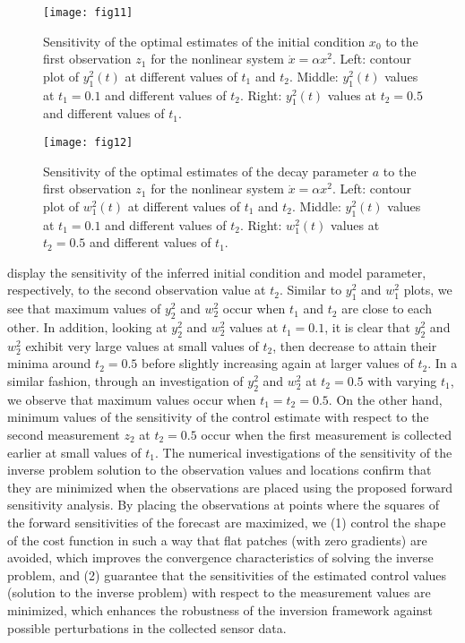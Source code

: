 \documentclass{article}
\begin{document}
\begin{figure}[ht!]
    \centering
    \texttt{[image: fig11]}
    \caption{Sensitivity of the optimal estimates of the initial condition $x_0$ to the first observation $z_1$ for the nonlinear system $\dot{x} = \alpha x^2$. Left: contour plot of $y_1^2(t)$ at different values of $t_1$ and $t_2$. Middle: $y_1^2(t)$ values at $t_1=0.1$ and different values of $t_2$. Right: $y_1^2(t)$ values at $t_2=0.5$ and different values of $t_1$.}
    \label{fig:y1non}
\end{figure}

\begin{figure}[ht!]
    \centering
    \texttt{[image: fig12]}
    \caption{Sensitivity of the optimal estimates of the decay parameter $a$ to the first observation $z_1$ for the nonlinear system $\dot{x} = \alpha x^2$. Left: contour plot of $w_1^2(t)$ at different values of $t_1$ and $t_2$. Middle: $y_1^2(t)$ values at $t_1=0.1$ and different values of $t_2$. Right: $w_1^2(t)$ values at $t_2=0.5$ and different values of $t_1$.}
    \label{fig:w1non}
\end{figure}

 display the sensitivity of the inferred initial condition and model parameter, respectively, to the second observation value at $t_2$. Similar to $y_1^2$ and $w_1^2$ plots, we see that maximum values of $y_2^2$ and $w_2^2$ occur when $t_1$ and $t_2$ are close to each other. In addition, looking at $y_2^2$ and $w_2^2$ values at $t_1=0.1$, it is clear that $y_2^2$ and $w_2^2$ exhibit very large values at small values of $t_2$, then decrease to attain their minima around $t_2=0.5$ before slightly increasing again at larger values of $t_2$. In a similar fashion, through an investigation of $y_2^2$ and $w_2^2$ at $t_2=0.5$ with varying $t_1$, we observe that maximum values occur when $t_1=t_2=0.5$. On the other hand, minimum values of the sensitivity of the control estimate with respect to the second measurement $z_2$ at $t_2=0.5$ occur when the first measurement is collected earlier at small values of $t_1$. The numerical investigations of the sensitivity of the inverse problem solution to the observation values and locations confirm that they are minimized when the observations are placed using the proposed forward sensitivity analysis. By placing the observations at points where the squares of the forward sensitivities of the forecast are maximized, we (1) control the shape of the cost function in such a way that flat patches (with zero gradients) are avoided, which improves the convergence characteristics of solving the inverse problem, and (2) guarantee that the sensitivities of the estimated control values (solution to the inverse problem) with respect to the measurement values are minimized, which enhances the robustness of the inversion framework against possible perturbations in the collected sensor data.
\end{document}
